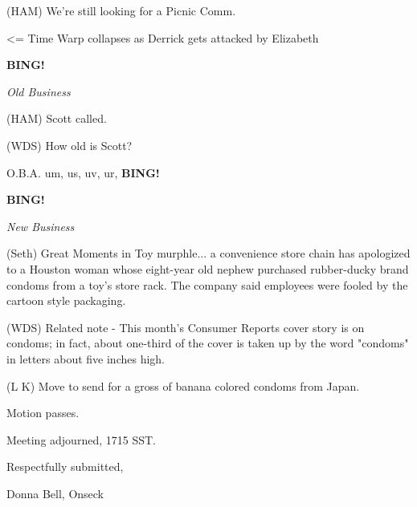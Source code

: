 \documentclass[12pt]{article}
\newcommand{\bing}{{\bf BING!} }
\newcommand{\goto}[1]{\bing \vskip 12pt \centerline{{\em{#1}}}}
\begin{document}
(HAM) We're still looking for a Picnic Comm.

<= Time Warp collapses as Derrick gets attacked by Elizabeth

\goto{Old Business}

(HAM) Scott called.

(WDS) How old is Scott?

O.B.A. um, us, uv, ur, \bing

\goto{New Business}

(Seth) Great Moments in Toy murphle... a convenience store chain has apologized to a Houston woman whose eight-year old nephew purchased rubber-ducky brand condoms from a toy's store rack.  The company said employees were fooled by the cartoon style packaging.

(WDS) Related note - This month's Consumer Reports cover story is on condoms; in fact, about one-third of the cover is taken up by the word "condoms" in letters about five inches high.

(L K) Move to send for a gross of banana colored condoms from Japan.

Motion passes.

\vspace{12pt}

\noindent
Meeting adjourned, 1715 SST.

\vspace{18pt}

\centerline{Respectfully submitted,}
\centerline{Donna Bell, Onseck}
\end{document}
